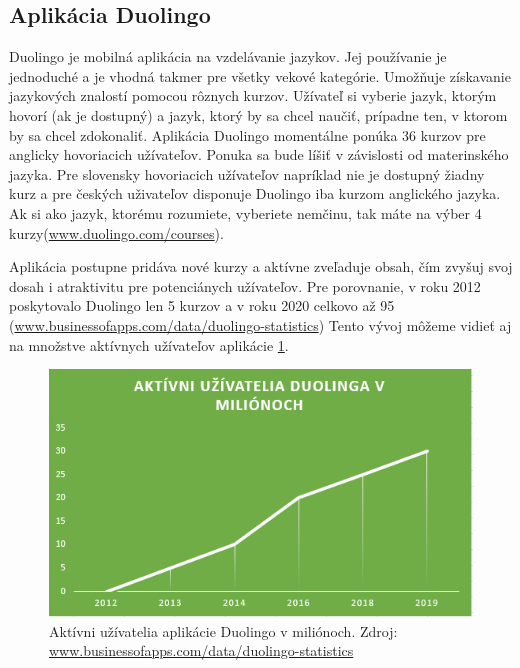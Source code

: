 \documentclass[10pt,oneside,slovak,a4paper]{article}
\begin{document}
\subsection{Aplikácia Duolingo}%
Duolingo je mobilná aplikácia na vzdelávanie jazykov. Jej používanie je jednoduché a je vhodná takmer pre všetky vekové kategórie\cite{duolingo}. Umožňuje získavanie jazykových znalostí pomocou rôznych kurzov. Užívateľ si vyberie jazyk, ktorým hovorí (ak je dostupný) a jazyk, ktorý by sa chcel naučiť, prípadne ten, v ktorom by sa chcel zdokonaliť. Aplikácia Duolingo momentálne ponúka 36 kurzov pre anglicky hovoriacich užívateľov. Ponuka sa bude líšiť v závislosti od materinského jazyka. Pre slovensky hovoriacich užívateľov napríklad nie je dostupný žiadny kurz a pre českých uživateľov disponuje Duolingo iba kurzom anglického jazyka. Ak si ako jazyk, ktorému rozumiete, vyberiete nemčinu, tak máte na výber 4 kurzy(\href{https://www.duolingo.com/courses}{www.duolingo.com/courses}).

Aplikácia postupne pridáva nové kurzy a aktívne zveľaduje obsah, čím zvyšuj svoj dosah i atraktivitu pre potenciánych užívateľov. Pre porovnanie, v roku 2012 poskytovalo Duolingo len 5 kurzov a v roku 2020 celkovo až 95 (\href{https://www.businessofapps.com/data/duolingo-statistics/}{www.businessofapps.com/data/duolingo-statistics}) Tento vývoj môžeme vidieť aj na množstve aktívnych užívateľov aplikácie \ref{duo-uzivatelia}.

\begin{figure}[h] %
\centering
\includegraphics[width=\textwidth]{duolingo.png}
\caption{ Aktívni užívatelia aplikácie Duolingo v miliónoch.
Zdroj: \href{https://www.businessofapps.com/data/duolingo-statistics/}{www.businessofapps.com/data/duolingo-statistics}}
\label{duo-uzivatelia}
\end{figure}
\end{document}
